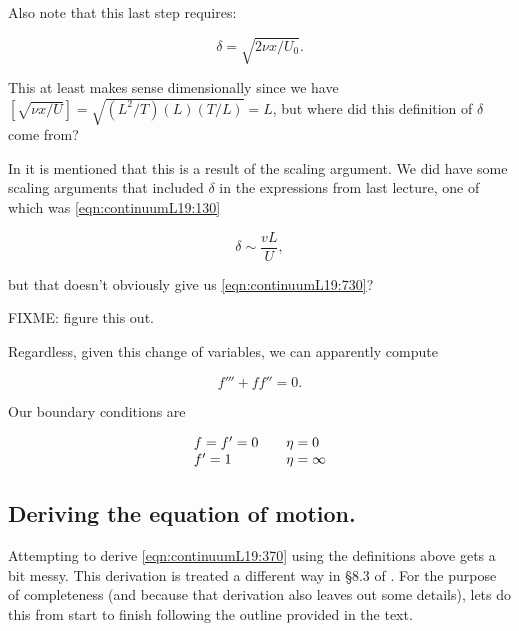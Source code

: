 Also note that this last step requires:

\begin{equation}\label{eqn:continuumL19:730}
\delta = \sqrt{ 2 \nu x/U_0 }.
\end{equation}

This at least makes sense dimensionally since we have $[\sqrt{\nu x/U}] = \sqrt{ (L^2/T) (L) (T/L)} = L$, but where did this definition of $\delta$ come from?

In \cite{ wiki:BlasiusBoundary} it is mentioned that this is a result of the scaling argument.  We did have some scaling arguments that included $\delta$ in the expressions from last lecture, one of which was \ref{eqn:continuumL19:130}

\begin{equation}\label{eqn:continuumL19:750}
\delta \sim \frac{v L}{U},
\end{equation}

but that doesn't obviously give us \ref{eqn:continuumL19:730}?

FIXME: figure this out.

Regardless, given this change of variables, we can apparently compute

\begin{equation}\label{eqn:continuumL19:370}
f''' + f f'' = 0.
\end{equation}

Our boundary conditions are

\begin{equation}\label{eqn:continuumL19:390}
\begin{array}{l l}
f = f' = 0 & \quad \mbox{$\eta = 0$} \\
f' = 1 & \quad \mbox{$\eta = \infty$} \\
\end{array}
\end{equation}

\subsection{Deriving the equation of motion.}

Attempting to derive \ref{eqn:continuumL19:370} using the definitions above gets a bit messy.
This derivation is treated a different way in \S 8.3 of \cite{acheson1990elementary}.  For the purpose of completeness (and because that derivation also leaves out some details), lets do this from start to finish following the outline provided in the text.

